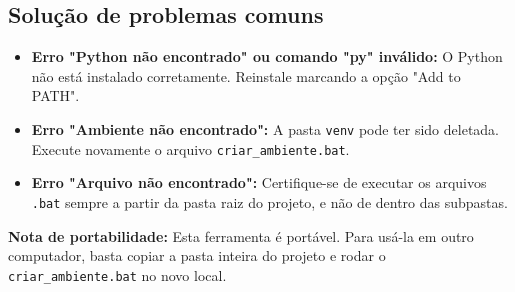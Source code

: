 \subsection{Solução de problemas comuns}

\begin{itemize}
    \item \textbf{Erro "Python não encontrado" ou comando "py" inválido:} O Python não está instalado corretamente. Reinstale marcando a opção "Add to PATH".
    \item \textbf{Erro "Ambiente não encontrado":} A pasta \texttt{venv} pode ter sido deletada. Execute novamente o arquivo \texttt{criar\_ambiente.bat}.
    \item \textbf{Erro "Arquivo não encontrado":} Certifique-se de executar os arquivos \texttt{.bat} sempre a partir da pasta raiz do projeto, e não de dentro das subpastas.
\end{itemize}

\vspace{0.5cm}
\textbf{Nota de portabilidade:} Esta ferramenta é portável. Para usá-la em outro computador, basta copiar a pasta inteira do projeto e rodar o \texttt{criar\_ambiente.bat} no novo local.

\newpage